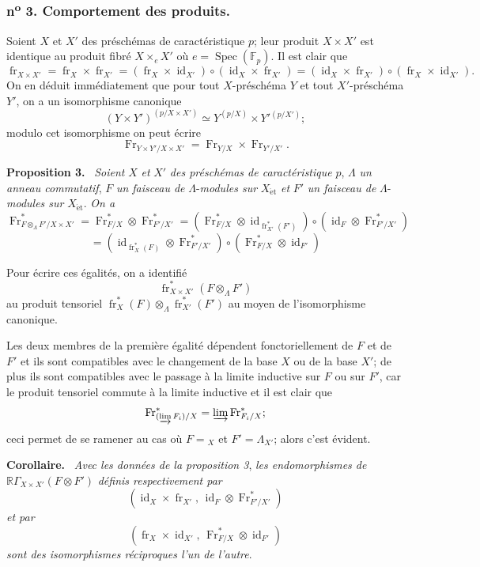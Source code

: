 \documentclass[11pt]{article}
\newenvironment{statement}[1]{\par\medskip\noindent\textbf{#1.}\ }{\par\medskip}
\DeclareMathOperator{\Spec}{Spec}
\newcommand{\R}{\mathbb{R}}\newcommand{\RHomCore}{\mathbb{R}\mathrm{Hom}}
\providecommand{\et}{\mathrm{\acute{e}t}}
\providecommand{\RGamma}{\R\Gamma}
\providecommand{\id}{\operatorname{id}}
\providecommand{\id}{\operatorname{id}}
\providecommand{\id}{\operatorname{id}}
\providecommand{\RGamma}{\R\Gamma}
\providecommand{\R}{\mathrm R}
\providecommand{\id}{\operatorname{id}}
\providecommand{\Spec}{\operatorname{Spec}}
\providecommand{\Spec}{\operatorname{Spec}}
\providecommand{\id}{\operatorname{id}}
\providecommand{\Spec}{\operatorname{Spec}}
\providecommand{\fr}{\operatorname{fr}}
\providecommand{\Fr}{\operatorname{Fr}}
\providecommand{\Fr}{\operatorname{Fr}}
\providecommand{\fr}{\operatorname{fr}}
\providecommand{\Spec}{\operatorname{Spec}}
\providecommand{\id}{\operatorname{id}}
\providecommand{\RGamma}{\R\Gamma}
\providecommand{\et}{\acute{e}t}
\begin{document}
\subsubsection*{n\textsuperscript{o} 3. Comportement des produits.}

Soient $X$ et $X'$ des préschémas de caractéristique $p$; leur produit $X\times X'$ est identique au produit fibré $X\times_eX'$ où $e=\Spec(\mathbb F_p)$. Il est clair que
\[
\fr_{X\times X'}=\fr_X\times\fr_{X'}=(\fr_X\times\id_{X'})\circ(\id_X\times\fr_{X'})
=(\id_X\times\fr_{X'})\circ(\fr_X\times\id_{X'}).
\]
On en déduit immédiatement que pour tout $X$-préschéma $Y$ et tout $X'$-préschéma $Y'$, on a un isomorphisme canonique
\[
(Y\times Y')^{(p/X\times X')}\simeq Y^{(p/X)}\times Y'{}^{(p/X')};
\]
modulo cet isomorphisme on
peut écrire
\[
\Fr_{Y\times Y'/X\times X'}=\Fr_{Y/X}\times\Fr_{Y'/X'}.
\]

\begin{statement}{Proposition 3}
\emph{Soient} $X$ \emph{et} $X'$ \emph{des préschémas de caractéristique} $p$, $\Lambda$ \emph{un anneau commutatif}, $F$ \emph{un faisceau de} $\Lambda$-\emph{modules sur} $X_{\et}$ \emph{et} $F'$ \emph{un faisceau de} $\Lambda$-\emph{modules sur} $X_{\et}$. \emph{On a}
\[
\Fr^*_{F\otimes_\Lambda F'/X\times X'}
=\Fr^*_{F/X}\otimes\Fr^*_{F'/X'}
=(\Fr^*_{F/X}\otimes\id_{\fr_{X'}^*(F')})\circ
(\id_F\otimes\Fr^*_{F'/X'})
\]
\[
=(\id_{\fr_X^*(F)}\otimes\Fr^*_{F'/X'})\circ
(\Fr^*_{F/X}\otimes\id_{F'})
\]
\end{statement}

Pour écrire ces égalités, on a identifié
\[
\fr_{X\times X'}^*(F\otimes_\Lambda F')
\]
au produit tensoriel $\fr_X^*(F)\otimes_\Lambda\fr_{X'}^*(F')$ au moyen de l'isomorphisme canonique.

Les deux membres de la première égalité dépendent fonctoriellement de $F$ et de $F'$ et ils sont compatibles avec le changement de la base $X$ ou de la base $X'$; de plus ils sont compatibles avec le passage à la limite inductive sur $F$ ou sur $F'$, car le produit tensoriel commute à la limite inductive et il est clair que
\[
\Fr^*_{(\varinjlim F_i)/X}=\varinjlim\Fr^*_{F_i/X};
\]
ceci permet de se ramener au cas où $F={}_X$ et $F'=\Lambda_{X'}$; alors c'est évident.

\begin{statement}{Corollaire}
\emph{Avec les données de la proposition 3}, \emph{les endomorphismes de} $\RGamma_{X\times X'}(F\otimes F')$ \emph{définis respectivement par}
\[
(\id_X\times\fr_{X'},\,\id_F\otimes\Fr^*_{F'/X'})
\]
\emph{et par}
\[
(\fr_X\times\id_{X'},\,\Fr^*_{F/X}\otimes\id_{F'})
\]
\emph{sont des isomorphismes réciproques l'un de l'autre}.
\end{statement}
\end{document}
